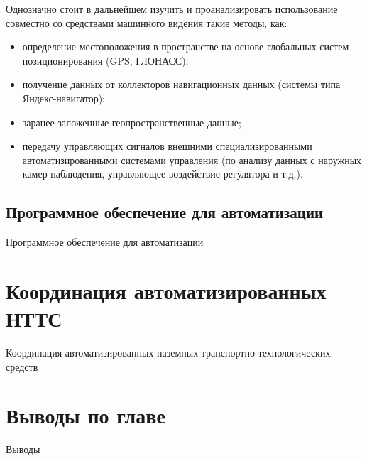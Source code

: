 Однозначно стоит в дальнейшем изучить и проанализировать использование совместно со средствами машинного видения такие методы, как:

\begin{itemize}
    \item определение местоположения в пространстве на основе глобальных систем позиционирования (GPS, ГЛОНАСС);
    \item получение данных от коллекторов навигационных данных (системы типа Яндекс-навигатор);
    \item заранее заложенные геопространственные данные;
    \item передачу управляющих сигналов внешними специализированными автоматизированными системами управления (по анализу данных с наружных камер наблюдения, управляющее воздействие регулятора и т.д.).
\end{itemize}


\subsection{Программное обеспечение для автоматизации}\label{subsec:ch1/sec2/sub3}

Программное обеспечение для автоматизации

\section{Координация автоматизированных НТТС}\label{sec:ch1/sec3}

Координация автоматизированных наземных транспортно-технологических средств

\section*{Выводы по главе}\label{sec:ch1/sec4}

Выводы

\FloatBarrier
